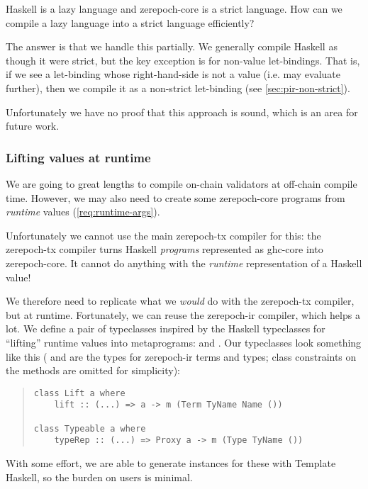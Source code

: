 Haskell is a lazy language and \gls{zerepoch-core} is a strict language.
How can we compile a lazy language into a strict language efficiently?

The answer is that we handle this partially.
We generally compile Haskell as though it were strict, but the key exception is for non-value let-bindings.
That is, if we see a let-binding whose right-hand-side is not a value (i.e. may evaluate further), then we compile it as a non-strict let-binding (see \cref{sec:pir-non-strict}).

Unfortunately we have no proof that this approach is sound, which is an area for future work.

\subsubsection{Lifting values at runtime}
\label{sec:zerepoch-tx-lifting}

We are going to great lengths to compile \gls{on-chain} \glspl{validator} at \gls{off-chain} compile time.
However, we may also need to create some \gls{zerepoch-core} programs from \emph{runtime} values (\cref{req:runtime-args}).

Unfortunately we cannot use the main \gls{zerepoch-tx} compiler for this: the \gls{zerepoch-tx} compiler turns Haskell \emph{programs} represented as \gls{ghc-core} into \gls{zerepoch-core}.
It cannot do anything with the \emph{runtime} representation of a Haskell value!

We therefore need to replicate what we \emph{would} do with the \gls{zerepoch-tx} compiler, but at runtime.
Fortunately, we can reuse the \gls{zerepoch-ir} compiler, which helps a lot.
We define a pair of typeclasses inspired by the Haskell typeclasses for ``lifting'' runtime values into metaprograms:  and .
Our typeclasses look something like this ( and  are the types for \gls{zerepoch-ir} terms and types; class constraints on the methods are omitted for simplicity):

\begin{quote}
\begin{verbatim}
class Lift a where
    lift :: (...) => a -> m (Term TyName Name ())

class Typeable a where
    typeRep :: (...) => Proxy a -> m (Type TyName ())
\end{verbatim}
\end{quote}

With some effort, we are able to generate instances for these with Template Haskell, so the burden on users is minimal.

